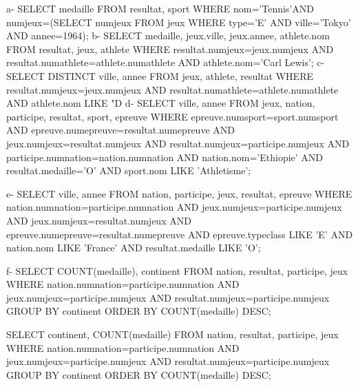 \documentclass[a4paper, 12pt]{article}
\begin{document}
a-
SELECT medaille
FROM resultat, sport
WHERE nom='Tennis'AND numjeux=(SELECT numjeux FROM jeux WHERE type='E' AND ville='Tokyo' AND annee=1964);
\newline
b-
SELECT medaille, jeux.ville, jeux.annee, athlete.nom
FROM resultat, jeux, athlete
WHERE resultat.numjeux=jeux.numjeux AND resultat.numathlete=athlete.numathlete AND athlete.nom='Carl Lewis';
\newline
c-
SELECT DISTINCT ville, annee
FROM jeux, athlete, resultat
WHERE resultat.numjeux=jeux.numjeux AND resultat.numathlete=athlete.numathlete AND athlete.nom LIKE "D%
\newline
d-
SELECT ville, annee
FROM jeux, nation, participe, resultat, sport, epreuve
WHERE epreuve.numsport=sport.numsport AND epreuve.numepreuve=resultat.numepreuve AND jeux.numjeux=resultat.numjeux AND resultat.numjeux=participe.numjeux AND participe.numnation=nation.numnation AND  nation.nom='Ethiopie' AND resultat.medaille='O' AND sport.nom LIKE 'Athletisme'; 

e-
SELECT ville, annee
FROM nation, participe, jeux, resultat, epreuve
WHERE nation.numnation=participe.numnation AND jeux.numjeux=participe.numjeux AND jeux.numjeux=resultat.numjeux AND epreuve.numepreuve=resultat.numepreuve AND epreuve.typeclass LIKE 'E' AND nation.nom LIKE 'France' AND resultat.medaille LIKE 'O';

\newline
f-
SELECT COUNT(medaille), continent
FROM nation, resultat, participe, jeux
WHERE nation.numnation=participe.numnation AND jeux.numjeux=participe.numjeux AND resultat.numjeux=participe.numjeux
GROUP BY continent
ORDER BY COUNT(medaille) DESC;

\newline

SELECT continent, COUNT(medaille)
FROM nation, resultat, participe, jeux
WHERE nation.numnation=participe.numnation AND jeux.numjeux=participe.numjeux AND resultat.numjeux=participe.numjeux
GROUP BY continent
ORDER BY COUNT(medaille) DESC;
\end{document}
